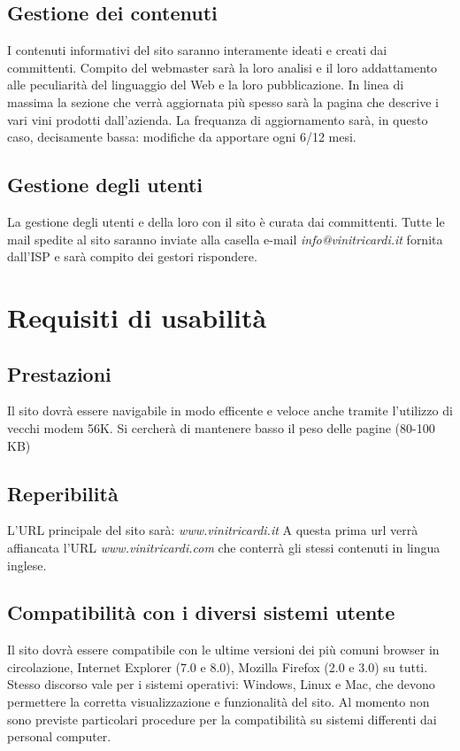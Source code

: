 \documentclass[a4paper]{report}	%
\begin{document}
\subsection{Gestione dei contenuti}
I contenuti informativi del sito saranno interamente ideati e creati dai committenti. Compito del webmaster sarà la loro analisi e il loro addattamento alle peculiarità del linguaggio del Web e la loro pubblicazione. In linea di massima la sezione che verrà aggiornata più spesso sarà la pagina che descrive i vari vini prodotti dall'azienda. La frequanza di aggiornamento sarà, in questo caso, decisamente bassa: modifiche da apportare ogni 6/12 mesi.
\subsection{Gestione degli utenti}
La gestione degli utenti e della loro con il sito è curata dai committenti. Tutte le mail spedite al sito saranno inviate alla casella e-mail \textsl{info@vinitricardi.it} fornita dall'ISP e sarà compito dei gestori rispondere.

\section{Requisiti di usabilità}
\subsection{Prestazioni}
Il sito dovrà essere navigabile in modo efficente e veloce anche tramite l'utilizzo di vecchi modem 56K. Si cercherà di mantenere basso il peso delle pagine (80-100 KB) 
\subsection{Reperibilità}
L'URL principale del sito sarà:
\textsl{www.vinitricardi.it}
A questa prima url verrà affiancata l'URL
\textsl{www.vinitricardi.com}
che conterrà gli stessi contenuti in lingua inglese.
\subsection{Compatibilità con i diversi sistemi utente}
Il sito dovrà essere compatibile con le ultime versioni dei più comuni browser in circolazione, Internet Explorer (7.0 e 8.0), Mozilla Firefox (2.0 e 3.0) su tutti. Stesso discorso vale per i sistemi operativi: Windows, Linux e Mac, che devono permettere la corretta visualizzazione e funzionalità del sito. 
Al momento non sono previste particolari procedure per la compatibilità su sistemi differenti dai personal computer.
\end{document}
